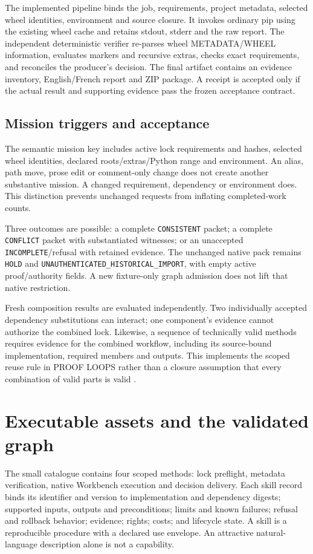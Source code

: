 \documentclass[11pt,a4paper]{article}
\newcommand{\code}[1]{\nolinkurl{#1}}
\begin{document}
The implemented pipeline binds the job, requirements, project metadata, selected wheel identities, environment and source closure. It invokes ordinary pip using the existing wheel cache and retains stdout, stderr and the raw report. The independent deterministic verifier re-parses wheel METADATA/WHEEL information, evaluates markers and recursive extras, checks exact requirements, and reconciles the producer's decision. The final artifact contains an evidence inventory, English/French report and ZIP package. A receipt is accepted only if the actual result and supporting evidence pass the frozen acceptance contract.

\subsection{Mission triggers and acceptance}
The semantic mission key includes active lock requirements and hashes, selected wheel identities, declared roots/extras/Python range and environment. An alias, path move, prose edit or comment-only change does not create another substantive mission. A changed requirement, dependency or environment does. This distinction prevents unchanged requests from inflating completed-work counts.

Three outcomes are possible: a complete \code{CONSISTENT} packet; a complete \code{CONFLICT} packet with substantiated witnesses; or an unaccepted \code{INCOMPLETE}/refusal with retained evidence. The unchanged native pack remains \code{HOLD} and \code{UNAUTHENTICATED_HISTORICAL_IMPORT}, with empty active proof/authority fields. A new fixture-only graph admission does not lift that native restriction.

Fresh composition results are evaluated independently. Two individually accepted dependency substitutions can interact; one component's evidence cannot authorize the combined lock. Likewise, a sequence of technically valid methods requires evidence for the combined workflow, including its source-bound implementation, required members and outputs. This implements the scoped reuse rule in PROOF LOOPS rather than a closure assumption that every combination of valid parts is valid \citep[§§11,14, pp.~5,7]{proofloops}.

\section{Executable assets and the validated graph}
\label{sec:graph}
The small catalogue contains four scoped methods: lock preflight, metadata verification, native Workbench execution and decision delivery. Each skill record binds its identifier and version to implementation and dependency digests; supported inputs, outputs and preconditions; limits and known failures; refusal and rollback behavior; evidence; rights; costs; and lifecycle state. A skill is a reproducible procedure with a declared use envelope. An attractive natural-language description alone is not a capability.
\end{document}
